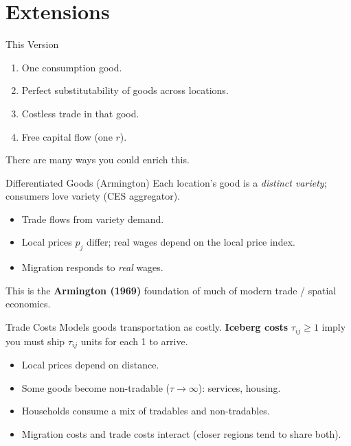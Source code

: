 \documentclass[10pt,aspectratio=169]{beamer}
\begin{document}
\section[Extensions]{Extensions}

\begin{frame}{This Version}
  \begin{enumerate}
    \item One consumption good.
    \item Perfect substitutability of goods across locations.
    \item Costless trade in that good.
    \item Free capital flow (one $r$).
  \end{enumerate}

  There are many ways you could enrich this.
\end{frame}

\begin{frame}{Differentiated Goods (Armington)}
  Each location's good is a \emph{distinct variety}; consumers love variety (CES aggregator).
  \begin{itemize}
    \item Trade flows from variety demand.
    \item Local prices $p_j$ differ; real wages depend on the local price index.
    \item Migration responds to \emph{real} wages.
  \end{itemize}
  This is the \textbf{Armington (1969)} foundation of much of modern trade / spatial economics.
\end{frame}

\begin{frame}{Trade Costs}
  Models goods transportation as costly. \textbf{Iceberg costs} $\tau_{ij} \geq 1$ imply you must ship $\tau_{ij}$ units for each 1 to arrive.
  \begin{itemize}
    \item Local prices depend on distance.
    \item Some goods become non-tradable ($\tau \to \infty$): services, housing.
    \item Households consume a mix of tradables and non-tradables.
    \item Migration costs and trade costs interact (closer regions tend to share both).
  \end{itemize}
\end{frame}
\end{document}
